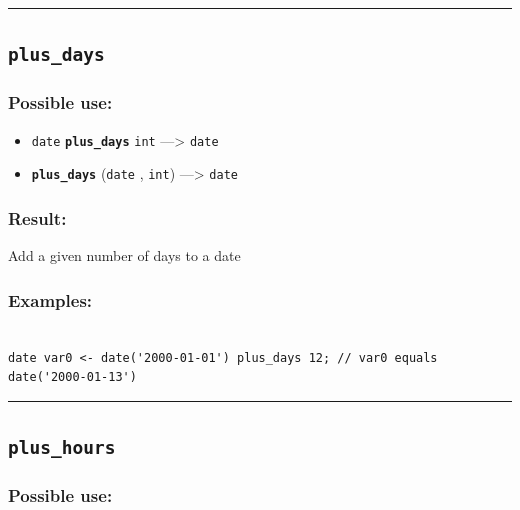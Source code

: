 \documentclass[]{book}
\providecommand{\tightlist}{%
  \setlength{\itemsep}{0pt}\setlength{\parskip}{0pt}}
\theoremstyle{definition}
\theoremstyle{definition}
\theoremstyle{definition}
\theoremstyle{remark}
\begin{document}
\begin{center}\rule{0.5\linewidth}{\linethickness}\end{center}

\subsection{\texorpdfstring{\texttt{plus\_days}}{plus\_days}}\label{plus_days}

\subsubsection{Possible use:}\label{possible-use-401}

\begin{itemize}
\tightlist
\item
  \texttt{date} \textbf{\texttt{plus\_days}} \texttt{int}
  ---\textgreater{} \texttt{date}
\item
  \textbf{\texttt{plus\_days}} (\texttt{date} , \texttt{int})
  ---\textgreater{} \texttt{date}
\end{itemize}

\subsubsection{Result:}\label{result-387}

Add a given number of days to a date

\subsubsection{Examples:}\label{examples-276}

\begin{verbatim}
 
date var0 <- date('2000-01-01') plus_days 12; // var0 equals date('2000-01-13')
\end{verbatim}

\begin{center}\rule{0.5\linewidth}{\linethickness}\end{center}

\subsection{\texorpdfstring{\texttt{plus\_hours}}{plus\_hours}}\label{plus_hours}

\subsubsection{Possible use:}\label{possible-use-402}
\end{document}

